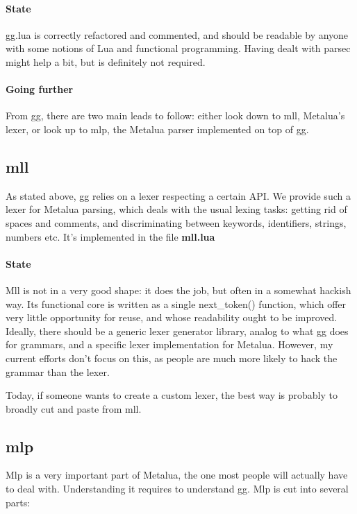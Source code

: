 \paragraph{State} 
gg.lua is correctly refactored and commented, and should be readable
by anyone with some notions of Lua and functional programming. Having
dealt with parsec might help a bit, but is definitely not required.

\paragraph{Going further} 
From gg, there are two main leads to follow: either look down to mll,
Metalua's lexer, or look up to mlp, the Metalua parser implemented on
top of gg.

\subsection{mll}

As stated above, gg relies on a lexer respecting a certain API. We
provide such a lexer for Metalua parsing, which deals with the usual
lexing tasks: getting rid of spaces and comments, and discriminating
between keywords, identifiers, strings, numbers etc. It's implemented
in the file {\bf mll.lua}

\paragraph{State}
Mll is not in a very good shape: it does the job, but often in a
somewhat hackish way. Its functional core is written as a single
next\_token() function, which offer very little opportunity for
reuse, and whose readability ought to be improved. Ideally,
there should be a generic lexer generator library, analog to what gg
does for grammars, and a specific lexer implementation for
Metalua. However, my current efforts don't focus on this, as people
are much more likely to hack the grammar than the lexer.

Today, if someone wants to create a custom lexer, the best way is
probably to broadly cut and paste from mll.

\subsection{mlp}

Mlp is a very important part of Metalua, the one most people will
actually have to deal with. Understanding it requires to understand
gg. Mlp is cut into several parts:

